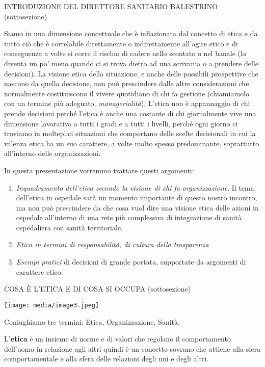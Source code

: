 \documentclass[]{article}
\begin{document}
INTRODUZIONE DEL DIRETTORE SANITARIO BALESTRINO (sottosezione)

Siamo in una dimensione concettuale che è inflazionata dal concetto di
etica e da tutto ciò che è correlabile direttamente o indirettamente
all'agire etico e di conseguenza a volte si corre il rischio di cadere
nello scontato o nel banale (lo diventa un po' meno quando ci si trova
dietro ad una scrivania o a prendere delle decisioni). La visione etica
della situazione, e anche delle possibili prospettive che nascono da
quella decisione, non può prescindere dalle altre considerazioni che
normalmente costituiscono il vivere quotidiano di chi fa gestione
(chiamiamolo con un termine più adeguato, \emph{managerialità}). L'etica
non è appannaggio di chi prende decisioni perché l'etica è anche una
costante di chi giornalmente vive una dimensione lavorativa a tutti i
gradi e a tutti i livelli, perché ogni giorno ci troviamo in molteplici
situazioni che comportano delle scelte decisionali in cui la valenza
etica ha un suo carattere, a volte molto spesso predominante,
soprattutto all'interno delle organizzazioni.

In questa presentazione vorremmo trattare questi argomenti:

\begin{enumerate}
\def\labelenumi{\arabic{enumi}.}
\item
  \emph{Inquadramento dell'etica secondo la visione di chi fa
  organizzazione}. Il tema dell'etica in ospedale sarà un momento
  importante di questo nostro incontro, ma non può prescindere da che
  cosa vuol dire una visione etica delle azioni in ospedale all'interno
  di una rete più complessiva di integrazione di sanità ospedaliera con
  sanità territoriale.
\item
  \emph{Etica in termini di responsabilità, di cultura della
  trasparenza}
\item
  \emph{Esempi pratici} di decisioni di grande portata, supportate da
  argomenti di carattere etico.
\end{enumerate}

COSA È L'ETICA E DI COSA SI OCCUPA (sottosezione)

\texttt{[image: media/image3.jpeg]}

Coniughiamo tre termini: Etica, Organizzazione, Sanità.

L'\textbf{etica} è un insieme di norme e di valori che regolano il
comportamento dell'uomo in relazione agli altri quindi è un concetto
sovrano che attiene alla sfera comportamentale e alla sfera delle
relazioni degli uni e degli altri.
\end{document}
